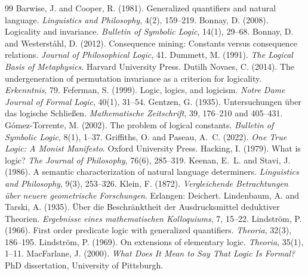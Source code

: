 \documentclass{situationist-preprint}
\begin{document}
\begin{thebibliography}{99}\small
{} Barwise, J. and Cooper, R. (1981). Generalized quantifiers and natural language. \emph{Linguistics and Philosophy}, 4(2), 159--219.
 Bonnay, D. (2008). Logicality and invariance. \emph{Bulletin of Symbolic Logic}, 14(1), 29--68.
 Bonnay, D. and Westerst{\aa}hl, D. (2012). Consequence mining: Constants versus consequence relations. \emph{Journal of Philosophical Logic}, 41.
 Dummett, M. (1991). \emph{The Logical Basis of Metaphysics}. Harvard University Press.
 Dutilh Novaes, C. (2014). The undergeneration of permutation invariance as a criterion for logicality. \emph{Erkenntnis}, 79.
 Feferman, S. (1999). Logic, logics, and logicism. \emph{Notre Dame Journal of Formal Logic}, 40(1), 31--54.
 Gentzen, G. (1935). Untersuchungen \"uber das logische Schlie{\ss}en. \emph{Mathematische Zeitschrift}, 39, 176--210 and 405--431.
 G\'omez-Torrente, M. (2002). The problem of logical constants. \emph{Bulletin of Symbolic Logic}, 8(1), 1--37.
 Griffiths, O. and Paseau, A.~C. (2022). \emph{One True Logic: A Monist Manifesto}. Oxford University Press.
 Hacking, I. (1979). What is logic? \emph{The Journal of Philosophy}, 76(6), 285--319.
 Keenan, E.~L. and Stavi, J. (1986). A semantic characterization of natural language determiners. \emph{Linguistics and Philosophy}, 9(3), 253--326.
 Klein, F. (1872). \emph{Vergleichende Betrachtungen \"uber neuere geometrische Forschungen}. Erlangen: Deichert.
 Lindenbaum, A. and Tarski, A. (1935). \"Uber die Beschr\"anktheit der Ausdrucksmittel deduktiver Theorien. \emph{Ergebnisse eines mathematischen Kolloquiums}, 7, 15--22.
 Lindstr\"om, P. (1966). First order predicate logic with generalized quantifiers. \emph{Theoria}, 32(3), 186--195.
 Lindstr\"om, P. (1969). On extensions of elementary logic. \emph{Theoria}, 35(1), 1--11.
 MacFarlane, J. (2000). \emph{What Does It Mean to Say That Logic Is Formal?} PhD dissertation, University of Pittsburgh.

\end{thebibliography}
\end{document}
